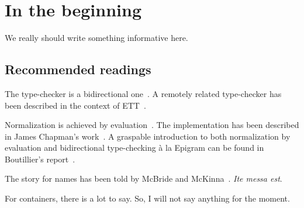 \section{In the beginning}

We really should write something informative here.

\subsection{Recommended readings}

The type-checker is a bidirectional
one~\cite{turner:bidirectional_tc}. A remotely related type-checker
has been described in the context of ETT~\cite{chapman:ett}.

Normalization is achieved by evaluation~\cite{dybjer:nbe,
  dybjer:dependent_types_work}. The implementation has been described
in James Chapman's work~\cite{chapman:phd}. A graspable introduction
to both normalization by evaluation and bidirectional type-checking
\`a la Epigram can be found in Boutillier's
report~\cite{boutillier:report}.

The story for names has been told by McBride and
McKinna~\cite{mcbride:free_variable}. \emph{Ite messa est}.

For containers, there is a lot to say. So, I will not say anything for
the moment.
